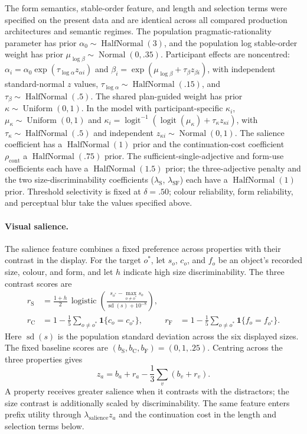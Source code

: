 \documentclass[10pt,a4paper,fleqn]{article}
\begin{document}
The form semantics, stable-order feature, and length and selection terms were specified on the present data and are identical across all compared production architectures and semantic regimes.
The population pragmatic-rationality parameter has prior $\alpha_0\sim\operatorname{HalfNormal}(3)$, and the population log stable-order weight has prior $\mu_{\log\beta}\sim\operatorname{Normal}(0,.35)$.
Participant effects are noncentred: $\alpha_i=\alpha_0\exp(\tau_{\log\alpha}z_{\alpha i})$ and $\beta_i=\exp(\mu_{\log\beta}+\tau_\beta z_{\beta i})$, with independent standard-normal $z$ values, $\tau_{\log\alpha}\sim\operatorname{HalfNormal}(.15)$, and $\tau_\beta\sim\operatorname{HalfNormal}(.5)$.
The shared plan-guided weight has prior $\kappa\sim\operatorname{Uniform}(0,1)$.
In the model with participant-specific $\kappa_i$, $\mu_\kappa\sim\operatorname{Uniform}(0,1)$ and $\kappa_i=\operatorname{logit}^{-1}(\operatorname{logit}(\mu_\kappa)+\tau_\kappa z_{\kappa i})$, with $\tau_\kappa\sim\operatorname{HalfNormal}(.5)$ and independent $z_{\kappa i}\sim\operatorname{Normal}(0,1)$.
The salience coefficient has a $\operatorname{HalfNormal}(1)$ prior and the continuation-cost coefficient $\rho_{\mathrm{cont}}$ a $\operatorname{HalfNormal}(.75)$ prior.
The sufficient-single-adjective and form-use coefficients each have a $\operatorname{HalfNormal}(1.5)$ prior; the three-adjective penalty and the two size-discriminability coefficients ($\lambda_{\mathrm S}$, $\lambda_{\mathrm{SF}}$) each have a $\operatorname{HalfNormal}(1)$ prior.
Threshold selectivity is fixed at $\delta=.50$; colour reliability, form reliability, and perceptual blur take the values specified above.

\paragraph{Visual salience.}
The salience feature combines a fixed preference across properties with their contrast in the display.
For the target $o^*$, let $s_o$, $c_o$, and $f_o$ be an object's recorded size, colour, and form, and let $h$ indicate high size discriminability.
The three contrast scores are
\begin{align}
 r_{\mathrm S}&=\frac{1+h}{2}\,
 \operatorname{logistic}\!\left(
 \frac{s_{o^*}-\max_{o\ne o^*}s_o}{\operatorname{sd}(s)+10^{-8}}
 \right),\\
 r_{\mathrm C}&=1-\frac{1}{5}\sum_{o\ne o^*}\mathbf 1\{c_o=c_{o^*}\},
 &r_{\mathrm F}&=1-\frac{1}{5}\sum_{o\ne o^*}\mathbf 1\{f_o=f_{o^*}\}.
\end{align}
Here $\operatorname{sd}(s)$ is the population standard deviation across the six displayed sizes.
The fixed baseline scores are $(b_{\mathrm S},b_{\mathrm C},b_{\mathrm F})=(0,1,.25)$.
Centring across the three properties gives
\[
 z_a=b_a+r_a-\frac13\sum_v(b_v+r_v).
\]
A property receives greater salience when it contrasts with the distractors; the size contrast is additionally scaled by discriminability.
The same feature enters prefix utility through $\lambda_{\mathrm{salience}}z_a$ and the continuation cost in the length and selection terms below.
\end{document}
